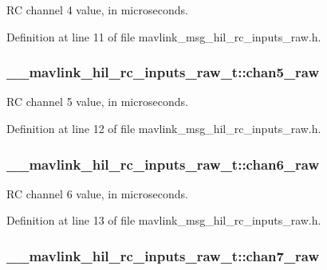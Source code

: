 R\-C channel 4 value, in microseconds. 



Definition at line 11 of file mavlink\-\_\-msg\-\_\-hil\-\_\-rc\-\_\-inputs\-\_\-raw.\-h.

\hypertarget{struct____mavlink__hil__rc__inputs__raw__t_aa351a492148d22983343be216e10e945}{
\subsubsection[{chan5\-\_\-raw}]{ \-\_\-\-\_\-mavlink\-\_\-hil\-\_\-rc\-\_\-inputs\-\_\-raw\-\_\-t\-::chan5\-\_\-raw}}\label{struct____mavlink__hil__rc__inputs__raw__t_aa351a492148d22983343be216e10e945}


R\-C channel 5 value, in microseconds. 



Definition at line 12 of file mavlink\-\_\-msg\-\_\-hil\-\_\-rc\-\_\-inputs\-\_\-raw.\-h.

\hypertarget{struct____mavlink__hil__rc__inputs__raw__t_a861d32c4cee885839426c6c27e9985f7}{
\subsubsection[{chan6\-\_\-raw}]{ \-\_\-\-\_\-mavlink\-\_\-hil\-\_\-rc\-\_\-inputs\-\_\-raw\-\_\-t\-::chan6\-\_\-raw}}\label{struct____mavlink__hil__rc__inputs__raw__t_a861d32c4cee885839426c6c27e9985f7}


R\-C channel 6 value, in microseconds. 



Definition at line 13 of file mavlink\-\_\-msg\-\_\-hil\-\_\-rc\-\_\-inputs\-\_\-raw.\-h.

\hypertarget{struct____mavlink__hil__rc__inputs__raw__t_a58471d376608366dc4e762c1cc07f0da}{
\subsubsection[{chan7\-\_\-raw}]{ \-\_\-\-\_\-mavlink\-\_\-hil\-\_\-rc\-\_\-inputs\-\_\-raw\-\_\-t\-::chan7\-\_\-raw}}\label{struct____mavlink__hil__rc__inputs__raw__t_a58471d376608366dc4e762c1cc07f0da}


